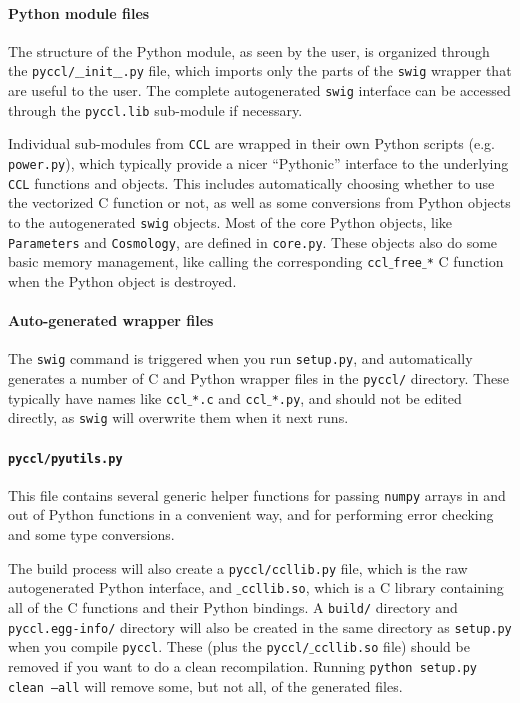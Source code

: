 \documentclass[\docopts]{\docclass}
\newcommand{\ccl}{{\tt CCL}\xspace}
\begin{document}
\paragraph{Python module files} The structure of the Python module, as seen by the user, is organized through the {\tt pyccl/$\_$$\_$init$\_$$\_$.py} file, which imports only the parts of the {\tt swig} wrapper that are useful to the user. The complete autogenerated {\tt swig} interface can be accessed through the {\tt pyccl.lib} sub-module if necessary.

Individual sub-modules from \ccl are wrapped in their own Python scripts (e.g. {\tt power.py}), which typically provide a nicer ``Pythonic'' interface to the underlying \ccl functions and objects. This includes automatically choosing whether to use the vectorized C function or not, as well as some conversions from Python objects to the autogenerated {\tt swig} objects. Most of the core Python objects, like {\tt Parameters} and {\tt Cosmology}, are defined in {\tt core.py}. These objects also do some basic memory management, like calling the corresponding {\tt ccl$\_$free$\_$*} C function when the Python object is destroyed.

\paragraph{Auto-generated wrapper files} The {\tt swig} command is triggered when you run {\tt setup.py}, and automatically generates a number of C and Python wrapper files in the {\tt pyccl/} directory. These typically have names like {\tt ccl$\_$*.c} and {\tt ccl$\_$*.py}, and should not be edited directly, as {\tt swig} will overwrite them when it next runs.

\paragraph{{\tt pyccl/pyutils.py}} This file contains several generic helper functions for passing {\tt numpy} arrays in and out of Python functions in a convenient way, and for performing error checking and some type conversions.

The build process will also create a {\tt pyccl/ccllib.py} file, which is the raw autogenerated Python interface, and {\tt $\_$ccllib.so}, which is a C library containing all of the C functions and their Python bindings. A {\tt build/} directory and {\tt pyccl.egg-info/} directory will also be created in the same directory as {\tt setup.py} when you compile {\tt pyccl}. These (plus the {\tt pyccl/$\_$ccllib.so} file) should be removed if you want to do a clean recompilation. Running {\tt python setup.py clean --all} will remove some, but not all, of the generated files.
\end{document}
